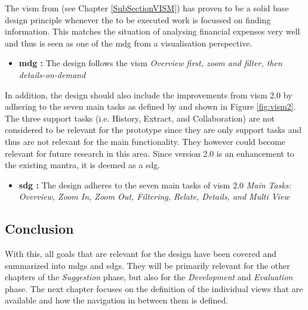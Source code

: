 The \gls{vism} from \cite{Shneiderman2005} (see Chapter \ref{SubSectionVISM}) has proven to be a solid base design principle whenever the to be executed work is focussed on finding information. This matches the situation of analysing financial expenses very well and thus is seen as one of the \gls{mdg} from a visualisation perspective.
\begin{itemize}[noitemsep,nolistsep]
	\item \textbf{\gls{mdg} :} The design follows the \gls{vism} \newline
		\textit{Overview first, zoom and filter, then details-on-demand}
\end{itemize}
In addition, the design should also include the improvements from \gls{vism} 2.0 by adhering to the seven main tasks as defined by \cite{Stauffer2016} and shown in Figure \ref{fig:vism2}. The three support tasks (i.e. History, Extract, and Collaboration) are not considered to be relevant for the prototype since they are only support tasks and thus are not relevant for the main functionality. They however could become relevant for future research in this area. Since version 2.0 is an enhancement to the existing mantra, it is deemed as a \gls{sdg}.
\begin{itemize}[noitemsep,nolistsep]
	\item \textbf{\gls{sdg} :} The design adheres to the seven main tasks of \gls{vism} 2.0 \newline
		\textit{Main Tasks: Overview, Zoom In, Zoom Out, Filtering, Relate, Details, and Multi View}
\end{itemize}

\addtocounter{MainDesignGoalCounter}{-1}
\addtocounter{SubDesignGoalCounter}{-1}



\subsection{Conclusion}

With this, all goals that are relevant for the design have been covered and summarized into  \glspl{mdg} and  \glspl{sdg}. They will be primarily relevant for the other chapters of the \textit{Suggestion} phase, but also for the \textit{Development} and \textit{Evaluation} phase. \newline
The next chapter focuses on the definition of the individual views that are available and how the navigation in between them is defined.



